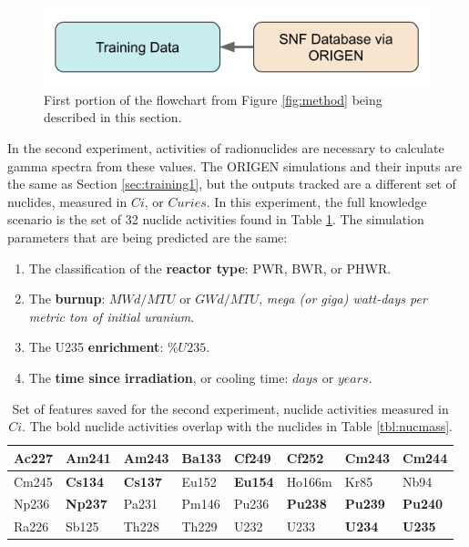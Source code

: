 \begin{figure}[H]
  \centering
  \includegraphics[width=0.7\linewidth]{./chapters/exp1/methodology1.png}
  \caption{First portion of the flowchart from Figure \ref{fig:method} being 
           described in this section.}
\end{figure}

In the second experiment, activities of radionuclides are necessary to
calculate gamma spectra from these values. The \gls{ORIGEN} simulations and
their inputs are the same as Section \ref{sec:training1}, but the outputs
tracked are a different set of nuclides, measured in $Ci$, or $Curies$.  In
this experiment, the full knowledge scenario is the set of 32 nuclide
activities found in Table \ref{tbl:nucacts}.  The simulation parameters that
are being predicted are the same:
\begin{enumerate}
  \item The classification of the \textbf{reactor type}: \gls{PWR}, \gls{BWR}, 
        or \gls{PHWR}.
  \item The \textbf{burnup}: $MWd/MTU$ or $GWd/MTU$, \textit{mega (or giga) 
        watt-days per metric ton of initial uranium}.
  \item The \gls{U235} \textbf{enrichment}: $\%U235$. 
  \item The \textbf{time since irradiation}, or cooling time: $days$ or $years$.
\end{enumerate}

\begin{table}[!htb]
  \centering
  \begin{tabular}{@{}|l|l|l|l|l|l|l|l|@{}}
    \hline
    Ac227&\textbf{Am241}&\textbf{Am243}&Ba133&Cf249         &Cf252          &Cm243         &\textbf{Cm244} \\ \hline
    Cm245&\textbf{Cs134}&\textbf{Cs137}&Eu152&\textbf{Eu154}&Ho166m         &Kr85          &Nb94           \\ \hline
    Np236&\textbf{Np237}&Pa231         &Pm146&Pu236         &\textbf{Pu238} &\textbf{Pu239}&\textbf{Pu240} \\ \hline
    Ra226&Sb125         &Th228         &Th229&U232          & U233          &\textbf{U234} &\textbf{U235}  \\ \hline
  \end{tabular}
  \caption{Set of features saved for the second experiment, nuclide activities
           measured in $Ci$. The bold nuclide activities overlap with the 
           nuclides in Table \ref{tbl:nucmass}.}
  \label{tbl:nucacts}
\end{table}

